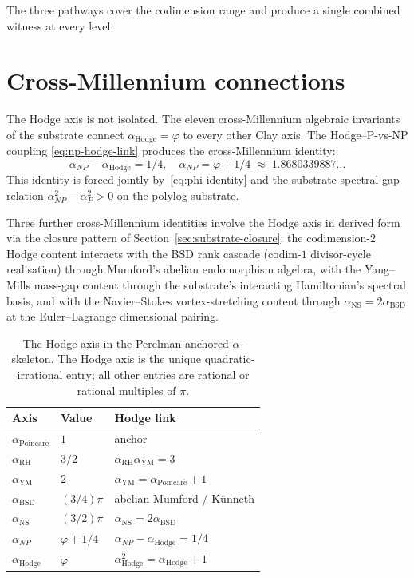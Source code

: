 \documentclass[11pt,a4paper]{article}
\theoremstyle{plain}
\theoremstyle{definition}
\begin{document}
The three pathways cover the codimension range and produce a
single combined witness at every level.

\section{Cross-Millennium connections}
\label{sec:cross-mm}

The Hodge axis is not isolated. The eleven cross-Millennium
algebraic invariants of the substrate connect $\alpha_{\mathrm{Hodge}}
= \varphi$ to every other Clay axis. The Hodge--P-vs-NP coupling
\eqref{eq:np-hodge-link} produces the cross-Millennium identity:
\begin{equation}
\label{eq:hodge-cross-link}
\alpha_{NP} - \alpha_{\mathrm{Hodge}} = 1/4,
\quad
\alpha_{NP} = \varphi + 1/4
\;\approx\; 1.8680339887\ldots
\end{equation}
This identity is forced jointly by~\eqref{eq:phi-identity} and the
substrate spectral-gap relation
$\alpha_{NP}^{2} - \alpha_{P}^{2} > 0$ on the polylog substrate.

Three further cross-Millennium identities involve the Hodge axis
in derived form via the closure pattern of
Section~\ref{sec:substrate-closure}: the codimension-$2$ Hodge
content interacts with the BSD rank cascade (codim-$1$
divisor-cycle realisation) through Mumford's abelian endomorphism
algebra, with the Yang--Mills mass-gap content through the
substrate's interacting Hamiltonian's spectral basis, and with the
Navier--Stokes vortex-stretching content through
$\alpha_{\mathrm{NS}} = 2 \alpha_{\mathrm{BSD}}$ at the
Euler--Lagrange dimensional pairing.

\begin{table}[h]
\centering
\begin{tabular}{lll}
\toprule
\textbf{Axis} & \textbf{Value} & \textbf{Hodge link} \\
\midrule
$\alpha_{\mathrm{Poincar\acute e}}$ & $1$ & anchor \\
$\alpha_{\mathrm{RH}}$ & $3/2$ & $\alpha_{\mathrm{RH}} \alpha_{\mathrm{YM}} = 3$ \\
$\alpha_{\mathrm{YM}}$ & $2$ & $\alpha_{\mathrm{YM}} = \alpha_{\mathrm{Poincar\acute e}} + 1$ \\
$\alpha_{\mathrm{BSD}}$ & $(3/4) \pi$ & abelian Mumford / K\"unneth \\
$\alpha_{\mathrm{NS}}$ & $(3/2) \pi$ & $\alpha_{\mathrm{NS}} = 2 \alpha_{\mathrm{BSD}}$ \\
$\alpha_{NP}$ & $\varphi + 1/4$ & $\alpha_{NP} - \alpha_{\mathrm{Hodge}} = 1/4$ \\
$\alpha_{\mathrm{Hodge}}$ & $\varphi$ & $\alpha_{\mathrm{Hodge}}^{2} = \alpha_{\mathrm{Hodge}} + 1$ \\
\bottomrule
\end{tabular}
\caption{The Hodge axis in the Perelman-anchored $\alpha$-skeleton.
The Hodge axis is the unique quadratic-irrational entry; all other
entries are rational or rational multiples of $\pi$.}
\label{tab:alpha}
\end{table}
\end{document}
